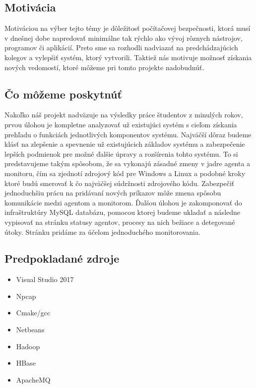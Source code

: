\documentclass[a4paper,12pt]{article}
\begin{document}
\subsection{Motivácia}
Motiváciou na výber tejto témy je dôležitosť počítačovej bezpečnosti, ktorá musí v dnešnej dobe napredovať minimálne tak rýchlo ako vývoj rôznych nástrojov, programov či aplikácií.
Preto sme sa rozhodli nadviazať na predchádzajúcich kolegov a vylepšiť systém, ktorý vytvorili. Taktiež nás motivuje možnosť získania nových vedomostí, ktoré môžeme pri tomto projekte nadobudnúť. \\

\subsection{Čo môžeme poskytnúť}
Nakoľko náš projekt nadväzuje na výsledky práce študentov z minulých rokov, prvou úlohou  je kompletne analyzovať už existujúci systém s cieľom získania prehľadu o funkciách jednotlivých komponentov systému. Najväčší dôraz budeme klásť na zlepšenie a spevnenie už existujúcich základov systému a zabezpečenie lepších podmienok pre možné ďalšie úpravy a rozšírenia tohto systému. To si predstavujeme takým spôsobom, že sa vykonajú zásadné zmeny v jadre agenta a monitoru, čím sa zjednotí zdrojový kód pre Windows a Linux a podobné kroky ktoré budú smerovať k čo najväčšej súdržnosti zdrojového kódu. Zabezpečiť jednoduchšiu prácu na pridávaní nových príkazov môže zmena spôsobu komunikácie medzi agentom a monitorom. Ďalšou úlohou je zakomponovať do infraštruktúry MySQL databázu, pomocou ktorej budeme ukladať a následne vypisovať na stránku statusy agentov, procesy na nich bežiace a detegované útoky. Stránku pridáme za účelom jednoduchého monitorovania. \\ 

\subsection{Predpokladané zdroje}
\begin{itemize} 
	\item Visual Studio 2017
	\item Npcap
	\item Cmake/gcc
	\item Netbeans
	\item Hadoop 
	\item HBase 
	\item ApacheMQ \\
\end{itemize} 
\end{document}
